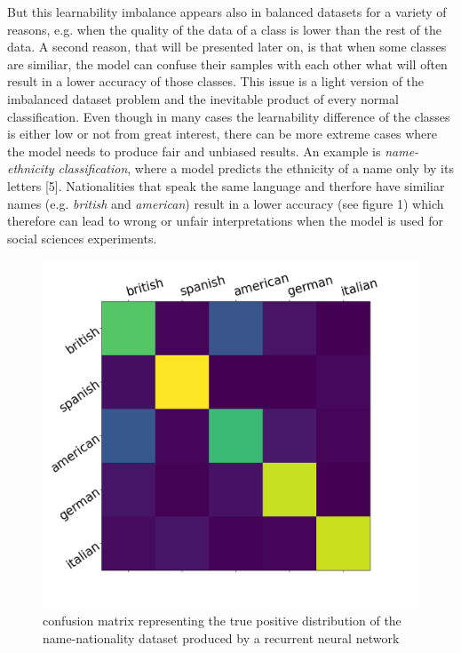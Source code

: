 \documentclass[journal]{IEEEtran}
\begin{document}

But this learnability imbalance appears also in balanced datasets for a variety of reasons, e.g. when the quality of the data of a class is lower than the rest of the data. 
A second reason, that will be presented later on, is that when some classes are similiar, %
the model can confuse their samples with each other what will often result in a lower accuracy of those classes.
This issue is a light version of the imbalanced dataset problem and the inevitable product of every normal classification. 
Even though in many cases the learnability difference of the classes is either low or not from great interest, there can be more extreme cases where the model needs to produce fair and unbiased results. 
An example is \emph{name-ethnicity classification}, where a model predicts the ethnicity of a name only by its letters [5]. 
Nationalities that speak the same language and therfore have similiar names (e.g. \emph{british} and \emph{american}) result in a lower accuracy (see figure 1) which therefore can lead to wrong or unfair interpretations when the model is used for social sciences experiments. 

\begin{figure}[h!]
        \includegraphics[width=\linewidth]{images/nec_confusion_matrix.png}
        \caption{confusion matrix representing the true positive distribution of the name-nationality dataset produced by a recurrent neural network}
        \label{fig:tp_scores}
\end{figure}
\end{document}
